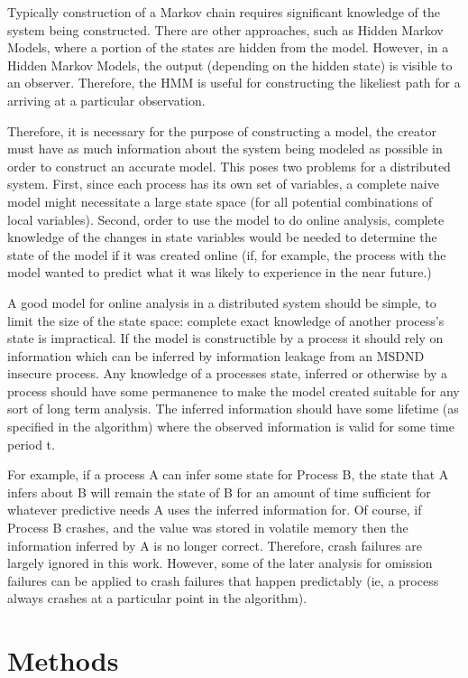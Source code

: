 \documentclass[12pt,oneside]{article}
\begin{document}
Typically construction of a Markov chain requires significant knowledge of the system being constructed. There are other approaches, such as Hidden Markov Models, where a portion of the states are hidden from the model. However, in a Hidden Markov Models, the output (depending on the hidden state) is visible to an observer. Therefore, the HMM is useful for constructing the likeliest path for a arriving at a particular observation.

Therefore, it is necessary for the purpose of constructing a model, the creator must have as much information about the system being modeled as possible in order to construct an accurate model. This poses two problems for a distributed system. First, since each process has its own set of variables, a complete naive model might necessitate a large state space (for all potential combinations of local variables). Second, order to use the model to do online analysis, complete knowledge of the changes in state variables would be needed to determine the state of the model if it was created online (if, for example, the process with the model wanted to predict what it was likely to experience in the near future.)

A good model for online analysis in a distributed system should be simple, to limit the size of the state space: complete exact knowledge of another process's state is impractical. If the model is constructible by a process it should rely on information which can be inferred by information leakage from an MSDND insecure process. Any knowledge of a processes state, inferred or otherwise by a process should have some permanence to make the model created suitable for any sort of long term analysis. The inferred information should have some lifetime (as specified in the algorithm) where the observed information is valid for some time period t.

For example, if a process A can infer some state for Process B, the state that A infers about B will remain the state of B for an amount of time sufficient for whatever predictive needs A uses the inferred information for. Of course, if Process B crashes, and the value was stored in volatile memory then the information inferred by A is no longer correct. Therefore, crash failures are largely ignored in this work. However, some of the later analysis for omission failures can be applied to crash failures that happen predictably (ie, a process always crashes at a particular point in the algorithm).

\section{Methods}
\end{document}
